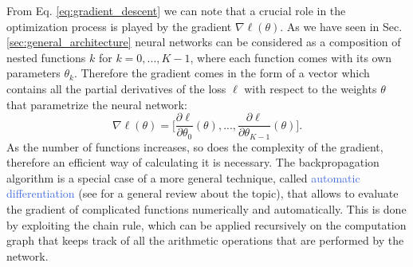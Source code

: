 From Eq. \ref{eq:gradient_descent} we can note that a crucial role in the optimization process is played by the gradient $\nabla\ell(\theta)$. As we have seen in Sec. \ref{sec:general_architecture} neural networks can be considered as a composition of nested functions $k$ for $k=0,...,K-1$, where each function comes with its own parameters $\theta_k$. Therefore the gradient comes in the form of a vector which contains all the partial derivatives of the loss $\ell$ with respect to the weights $\theta$ that parametrize the neural network:
\begin{equation}
	\nabla\ell(\theta) = \Big[\frac{\partial\ell}{\partial\theta_0}(\theta),...,\frac{\partial\ell}{\partial\theta_{K-1}}(\theta)\Big].
\end{equation}
As the number of functions increases, so does the complexity of the gradient, therefore an efficient way of calculating it is necessary. The backpropagation algorithm \cite{linnainmaa1970representation,bryson1975applied,rumelhart1986learning} is a special case of a more general technique, called \textcolor{RoyalBlue}{automatic differentiation} (see \cite{baydin2018automatic} for a general review about the topic), that allows to evaluate the gradient of complicated functions numerically and automatically. This is done by exploiting the chain rule, which can be applied recursively on the computation graph that keeps track of all the arithmetic operations that are performed by the network. 


